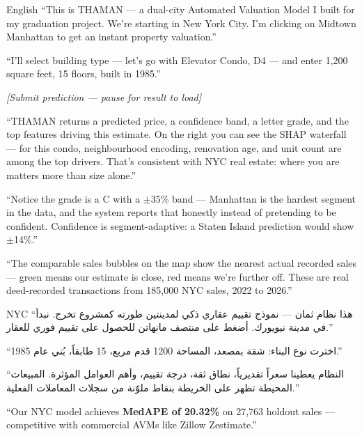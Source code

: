 \documentclass[11pt, a4paper, twoside]{article}
\begin{document}
\begin{narration}{English}
``This is THAMAN --- a dual-city Automated Valuation Model I built for my
graduation project. We're starting in New York City. I'm clicking on Midtown
Manhattan to get an instant property valuation.''

\medskip
``I'll select building type --- let's go with Elevator Condo, D4 --- and enter
1,200 square feet, 15 floors, built in 1985.''

\textit{[Submit prediction --- pause for result to load]}

``THAMAN returns a predicted price, a confidence band, a letter grade, and the
top features driving this estimate. On the right you can see the SHAP waterfall
--- for this condo, neighbourhood encoding, renovation age, and unit count are
among the top drivers. That's consistent with NYC real estate: where you are
matters more than size alone.''

``Notice the grade is a C with a $\pm$35\% band --- Manhattan is the hardest
segment in the data, and the system reports that honestly instead of pretending
to be confident. Confidence is segment-adaptive: a Staten Island prediction
would show $\pm$14\%.''

``The comparable sales bubbles on the map show the nearest actual recorded
sales --- green means our estimate is close, red means we're further off. These
are real deed-recorded transactions from 185,000 NYC sales, 2022 to 2026.''
\end{narration}

\begin{arabic}{NYC}
``هذا نظام ثمان --- نموذج تقييم عقاري ذكي لمدينتين طورته كمشروع تخرج. نبدأ في
مدينة نيويورك. أضغط على منتصف مانهاتن للحصول على تقييم فوري للعقار.''

``اخترت نوع البناء: شقة بمصعد، المساحة 1200 قدم مربع، 15 طابقاً، بُني عام 1985.''

``النظام يعطينا سعراً تقديرياً، نطاق ثقة، درجة تقييم، وأهم العوامل المؤثرة.
المبيعات المحيطة تظهر على الخريطة بنقاط ملوّنة من سجلات المعاملات الفعلية.''
\end{arabic}

\begin{tcolorbox}[colback=blue!5,colframe=blue!60,title=\textbf{Metric to highlight}]
``Our NYC model achieves \textbf{MedAPE of 20.32\%} on 27,763 holdout sales ---
competitive with commercial AVMs like Zillow Zestimate.''
\end{tcolorbox}

\end{document}
